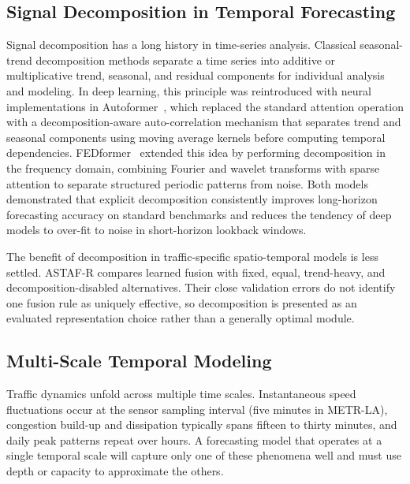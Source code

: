 \documentclass[fleqn,10pt]{wlscirep}
\newenvironment{changedcontent}{\color{changeblue}}{}
\begin{document}
\subsection{Signal Decomposition in Temporal Forecasting}

Signal decomposition has a long history in time-series analysis.
Classical seasonal-trend decomposition methods separate a time series
into additive or multiplicative trend, seasonal, and residual
components for individual analysis and modeling. In deep learning,
this principle was reintroduced with neural implementations in
Autoformer~\cite{wu2021autoformer}, which replaced the standard
attention operation with a decomposition-aware auto-correlation
mechanism that separates trend and seasonal components using moving
average kernels before computing temporal dependencies.
FEDformer~\cite{zhou2022fedformer} extended this idea by performing
decomposition in the frequency domain, combining Fourier and wavelet
transforms with sparse attention to separate structured periodic
patterns from noise. Both models demonstrated that explicit
decomposition consistently improves long-horizon forecasting accuracy
on standard benchmarks and reduces the tendency of deep models to
over-fit to noise in short-horizon lookback windows.

\begin{changedcontent}
The benefit of decomposition in traffic-specific spatio-temporal models is
less settled. ASTAF-R compares learned fusion with fixed, equal, trend-heavy,
and decomposition-disabled alternatives. Their close validation errors do not
identify one fusion rule as uniquely effective, so decomposition is presented
as an evaluated representation choice rather than a generally optimal module.
\end{changedcontent}

\subsection{Multi-Scale Temporal Modeling}

Traffic dynamics unfold across multiple time scales. Instantaneous
speed fluctuations occur at the sensor sampling interval (five minutes
in METR-LA), congestion build-up and dissipation typically spans
fifteen to thirty minutes, and daily peak patterns repeat over hours.
A forecasting model that operates at a single temporal scale will
capture only one of these phenomena well and must use depth or
capacity to approximate the others.
\end{document}
